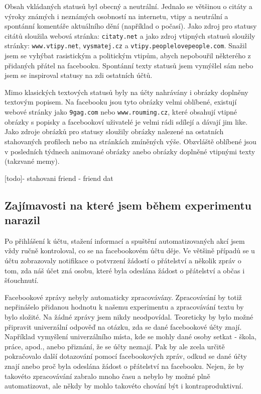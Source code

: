\documentclass[thesis=M,czech]{FITthesis}[2013/05/10]
\begin{document}
Obsah vkládaných statusů byl obecný a neutrální. Jednalo se většinou o citáty a výroky známých i neznámých osobností na internetu, vtipy a neutrální a spontánní komentáře aktuálního dění (například o počasí). Jako zdroj pro statusy citátů sloužila webová stránka: \verb|citaty.net| a jako zdroj vtipných statusů sloužily stránky: \verb|www.vtipy.net|, \verb|vysmatej.cz| a \verb|vtipy.peoplelovepeople.com|. Snažil jsem se vyhýbat rasistickým a politickým vtipům, abych nepobouřil některého z přidaných přátel na facebooku. Spontánní texty statusů jsem vymýšlel sám nebo jsem se inspiroval statusy na zdi ostatních účtů.

Mimo klasických textových statusů byly na účty nahrávány i obrázky doplněny textovým popisem. Na facebooku jsou tyto obrázky velmi oblíbené, existují webové stránky jako \verb|9gag.com| nebo \verb|www.rouming.cz|, které obsahují vtipné obrázky s popisky a facebookoví uživatelé je velmi rádi  sdílejí a dávají jim like. Jako zdroje obrázků pro statusy sloužily obrázky nalezené na ostatních stahovaných profilech nebo na stránkách zmíněných výše. Obzvláště oblíbené jsou v posledních týdnech animované obrázky anebo obrázky doplněné vtipnými texty (takzvané memy).

[todo]- stahovani friend - friend dat

\subsection{Zajímavosti na které jsem během experimentu narazil}

Po přihlášení k účtu, stažení informací a spuštění automatizovaných akcí jsem vždy ručně kontroloval, co se na facebookovém účtu děje. Ve většině případů se u účtu zobrazovaly notifikace o potvrzení žádostí o přátelství a několik zpráv o tom, zda náš účet zná osobu, které byla odeslána žádost o přátelství a občas i šťouchnutí.

Facebookové zprávy nebyly automaticky zpracovávány. Zpracovávání by totiž nepřinášelo přidanou hodnotu k našemu experimentu a zpracovávání textu by bylo složité. Na žádné zprávy jsem nikdy neodpovídal. Teoreticky by bylo možné připravit univerzální odpověď na otázku, zda se dané facebookové účty znají. Například vymyšlení univerzálního místa, kde se mohly dané osoby setkat - škola, práce, apod., anebo přiznání, že se účty neznají. Pak by ale zcela určitě pokračovalo další dotazování pomocí facebookových zpráv, odkud se dané účty znají anebo proč byla odeslána žádost o přátelství na facebooku. Nejen, že by takovéto zpracovávání zabralo mnoho času a nebylo by možné plně automatizovat, ale někdy by mohlo takovéto chování být i kontraproduktivní.
\end{document}
